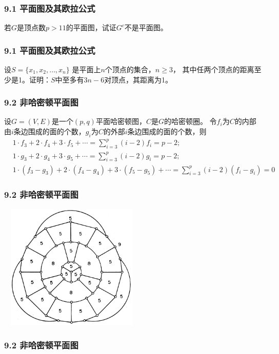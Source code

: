 \documentclass{beamer}
\begin{document}
\begin{CJK}{UTF8}{gbsn}
\begin{frame}
  \frametitle{9.1 平面图及其欧拉公式}
  \begin{exercise3}
    若$G$是顶点数$p > 11$的平面图，试证$G^c$不是平面图。
  \end{exercise3}
\end{frame}
\begin{frame}
  \frametitle{9.1 平面图及其欧拉公式}
  \begin{exercise4}
    设$S = \{x_1, x_2, \ldots, x_n\}$ 是平面上$n$个顶点的集合，$n \geq 3$， 其中任两个顶点的距离至少是1。证明：$S$中至多有$3n-6$对顶点，其距离为1。
  \end{exercise4}
\end{frame}

\begin{frame}
  \frametitle{9.2 非哈密顿平面图}
  \begin{theorem9.2.1}
    设$G=(V,E)$是一个$(p,q)$平面哈密顿图，$C$是$G$的哈密顿圈。
    令$f_i$为$C$的内部由$i$条边围成的面的个数，$g_i$为$C$的外部$i$条边围成的面的个数，则
    \begin{align}
      &1 \cdot f_3 + 2 \cdot f_4 + 3 \cdot f_5 + \cdots = \sum_{i=3}^p(i-2)f_i = p - 2;\\
      &1 \cdot g_3 + 2 \cdot g_4 + 3 \cdot g_5 + \cdots = \sum_{i=3}^p(i-2)g_i = p - 2;\\
      &1 \cdot (f_3 - g_3) + 2 \cdot (f_4 - g_4) + 3 \cdot (f_5 - g_5) + \cdots = \sum_{i=3}^p(i-2)(f_i - g_i) = 0
    \end{align}
  \end{theorem9.2.1}
\end{frame}

\begin{frame}
  \frametitle{9.2 非哈密顿平面图}
  \centering
  \includegraphics[width=7cm, height=6cm]{grinberg}
\end{frame}

\begin{frame}
  \frametitle{9.2 非哈密顿平面图}
  \centering
\end{frame}
\end{CJK}
\end{document}
